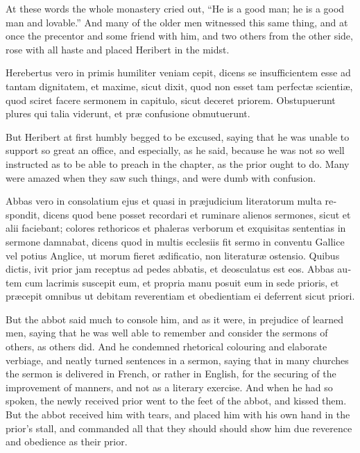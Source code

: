 \documentclass{book}
\begin{document}
\begin{paracol}{2}
\switchcolumn

At these words the whole monastery cried out, ``He is a good man; he is a good man and lovable.'' And many of the older men witnessed this same thing, and at once the precentor and some friend with him, and two others from the other side, rose with all haste and placed Heribert in the midst.

\switchcolumn*

\begin{otherlanguage}{latin}
Herebertus vero in primis humiliter veniam cepit, dicens se insufficientem esse ad tantam dignitatem, et maxime, sicut dixit, quod non esset tam perfect\ae{} scienti\ae{}, quod sciret facere sermonem in capitulo, sicut deceret priorem. Obstupuerunt plures qui talia viderunt, et pr\ae{} confusione obmutuerunt. 
\end{otherlanguage}

\switchcolumn

But Heribert at first humbly begged to be excused, saying that he was unable to support so great an office, and especially, as he said, because he was not so well instructed as to be able to preach in the chapter, as the prior ought to do. Many were amazed when they saw such things, and were dumb with confusion.

\switchcolumn*

\begin{otherlanguage}{latin}
Abbas vero in consolatium ejus et quasi in pr\ae{}judicium literatorum multa respondit, dicens quod bene posset recordari et ruminare alienos sermones, sicut et alii faciebant; colores rethoricos et phaleras verborum et exquisitas sententias in sermone damnabat, dicens quod in multis ecclesiis fit sermo in conventu Gallice vel potius Anglice, ut morum fieret \ae{}dificatio, non literatur\ae{} ostensio. Quibus dictis, ivit prior jam receptus ad pedes abbatis, et deosculatus est eos. Abbas autem cum lacrimis suscepit eum, et propria manu posuit eum in sede prioris, et pr\ae{}cepit omnibus ut debitam reverentiam et obedientiam ei deferrent sicut priori.
\end{otherlanguage}

\switchcolumn

But the abbot said much to console him, and as it were, in prejudice of learned men, saying that he was well able to remember and consider the sermons of others, as others did. And he condemned rhetorical colouring and elaborate verbiage, and neatly turned sentences in a sermon, saying that in many churches the sermon is delivered in French, or rather in English, for the securing of the improvement of manners, and not as a literary exercise. And when he had so spoken, the newly received prior went to the feet of the abbot, and kissed them. But the abbot received him with tears, and placed him with his own hand in the prior's stall, and commanded all that they should should show him due reverence and obedience as their prior.


\end{paracol}
\end{document}
